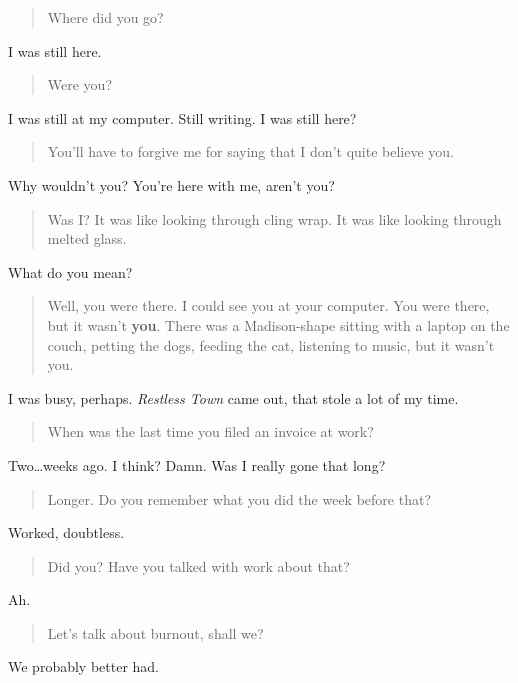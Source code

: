 \begin{quote}
Where did you go?
\end{quote}

I was still here.

\begin{quote}
Were you?
\end{quote}

I was still at my computer. Still writing. I was still here?

\begin{quote}
You'll have to forgive me for saying that I don't quite believe you.
\end{quote}

Why wouldn't you? You're here with me, aren't you?

\begin{quote}
Was I? It was like looking through cling wrap. It was like looking through melted glass.
\end{quote}

What do you mean?

\begin{quote}
Well, you were there. I could see you at your computer. You were there, but it wasn't \textbf{you}. There was a Madison-shape sitting with a laptop on the couch, petting the dogs, feeding the cat, listening to music, but it wasn't you.
\end{quote}

I was busy, perhaps. \emph{Restless Town} came out, that stole a lot of my time.

\begin{quote}
When was the last time you filed an invoice at work?
\end{quote}

Two\ldots{}weeks ago. I think? Damn. Was I really gone that long?

\begin{quote}
Longer. Do you remember what you did the week before that?
\end{quote}

Worked, doubtless.

\begin{quote}
Did you? Have you talked with work about that?
\end{quote}

Ah.

\begin{quote}
Let's talk about burnout, shall we?
\end{quote}

We probably better had.
